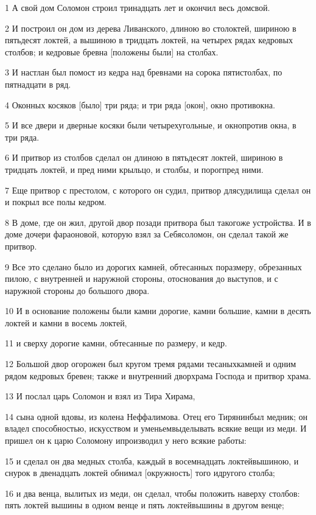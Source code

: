 \par 1 А свой дом Соломон строил тринадцать лет и окончил весь домсвой.
\par 2 И построил он дом из дерева Ливанского, длиною во столоктей, шириною в пятьдесят локтей, а вышиною в тридцать локтей, на четырех рядах кедровых столбов; и кедровые бревна [положены были] на столбах.
\par 3 И настлан был помост из кедра над бревнами на сорока пятистолбах, по пятнадцати в ряд.
\par 4 Оконных косяков [было] три ряда; и три ряда [окон], окно противокна.
\par 5 И все двери и дверные косяки были четырехугольные, и окнопротив окна, в три ряда.
\par 6 И притвор из столбов сделал он длиною в пятьдесят локтей, шириною в тридцать локтей, и пред ними крыльцо, и столбы, и порогпред ними.
\par 7 Еще притвор с престолом, с которого он судил, притвор длясудилища сделал он и покрыл все полы кедром.
\par 8 В доме, где он жил, другой двор позади притвора был такогоже устройства. И в доме дочери фараоновой, которую взял за Себясоломон, он сделал такой же притвор.
\par 9 Все это сделано было из дорогих камней, обтесанных поразмеру, обрезанных пилою, с внутренней и наружной стороны, отоснования до выступов, и с наружной стороны до большого двора.
\par 10 И в основание положены были камни дорогие, камни большие, камни в десять локтей и камни в восемь локтей,
\par 11 и сверху дорогие камни, обтесанные по размеру, и кедр.
\par 12 Большой двор огорожен был кругом тремя рядами тесаныхкамней и одним рядом кедровых бревен; также и внутренний дворхрама Господа и притвор храма.
\par 13 И послал царь Соломон и взял из Тира Хирама,
\par 14 сына одной вдовы, из колена Неффалимова. Отец его Тирянинбыл медник; он владел способностью, искусством и уменьемвыделывать всякие вещи из меди. И пришел он к царю Соломону ипроизводил у него всякие работы:
\par 15 и сделал он два медных столба, каждый в восемнадцать локтейвышиною, и снурок в двенадцать локтей обнимал [окружность] того идругого столба;
\par 16 и два венца, вылитых из меди, он сделал, чтобы положить наверху столбов: пять локтей вышины в одном венце и пять локтейвышины в другом венце;
